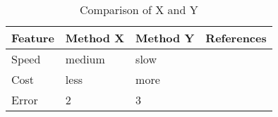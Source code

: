 \setlength{\tabcolsep}{0.5em} %
\renewcommand{\arraystretch}{2} %
\begin{table}[ht!]
  \centering
  \begin{tabularx}{0.9\textwidth}{|p{8em}|p{6em}p{6em}X|}
    \hline
    \textbf{Feature}     & \textbf{Method X}      & \textbf{Method Y}                           & \textbf{References}                      \\
    \hline
    \rowcolor[HTML]{EFEFEF}
    Speed                     &  medium     &  slow          &       \citet{Skoltech2017}             \\
    \hline
    Cost                        & less            & more          &                                  \\
    \hline
    \rowcolor[HTML]{EFEFEF}
    Error                      &        2           &                   3                   &                                         \\
    \hline
  \end{tabularx}
    \caption{Comparison of X and Y}
    \label{tab:comparison_x_and_y}%
\end{table}